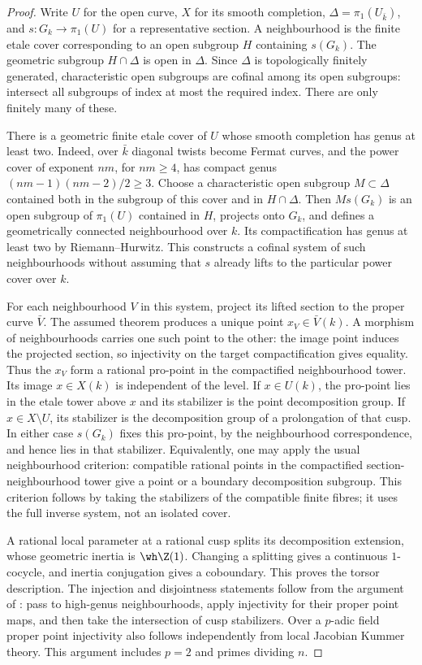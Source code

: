 \begin{proof}
Write $U$ for the open curve, $X$ for its smooth completion, $\Delta=\pi_1(U_{\bar k})$, and $s:G_k\to\pi_1(U)$ for a representative section. A neighbourhood is the finite etale cover corresponding to an open subgroup $H$ containing $s(G_k)$. The geometric subgroup $H\cap\Delta$ is open in $\Delta$. Since $\Delta$ is topologically finitely generated, characteristic open subgroups are cofinal among its open subgroups: intersect all subgroups of index at most the required index. There are only finitely many of these.

There is a geometric finite etale cover of $U$ whose smooth completion has genus at least two. Indeed, over $\bar k$ diagonal twists become Fermat curves, and the power cover of exponent $nm$, for $nm\ge4$, has compact genus $(nm-1)(nm-2)/2\ge3$. Choose a characteristic open subgroup $M\subset\Delta$ contained both in the subgroup of this cover and in $H\cap\Delta$. Then $Ms(G_k)$ is an open subgroup of $\pi_1(U)$ contained in $H$, projects onto $G_k$, and defines a geometrically connected neighbourhood over $k$. Its compactification has genus at least two by Riemann--Hurwitz. This constructs a cofinal system of such neighbourhoods without assuming that $s$ already lifts to the particular power cover over $k$.

For each neighbourhood $V$ in this system, project its lifted section to the proper curve $\bar V$. The assumed theorem produces a unique point $x_V\in\bar V(k)$. A morphism of neighbourhoods carries one such point to the other: the image point induces the projected section, so injectivity on the target compactification gives equality. Thus the $x_V$ form a rational pro-point in the compactified neighbourhood tower. Its image $x\in X(k)$ is independent of the level. If $x\in U(k)$, the pro-point lies in the etale tower above $x$ and its stabilizer is the point decomposition group. If $x\in X\setminus U$, its stabilizer is the decomposition group of a prolongation of that cusp. In either case $s(G_k)$ fixes this pro-point, by the neighbourhood correspondence, and hence lies in that stabilizer. Equivalently, one may apply the usual neighbourhood criterion: compatible rational points in the compactified section-neighbourhood tower give a point or a boundary decomposition subgroup. This criterion follows by taking the stabilizers of the compatible finite fibres; it uses the full inverse system, not an isolated cover.

A rational local parameter at a rational cusp splits its decomposition extension, whose geometric inertia is $\wh\Z(1)$. Changing a splitting gives a continuous $1$-cocycle, and inertia conjugation gives a coboundary. This proves the torsor description. The injection and disjointness statements follow from the argument of \citet[Theorem 14]{StixCuspidal}: pass to high-genus neighbourhoods, apply injectivity for their proper point maps, and then take the intersection of cusp stabilizers. Over a $p$-adic field proper point injectivity also follows independently from local Jacobian Kummer theory. This argument includes $p=2$ and primes dividing $n$.
\end{proof}

